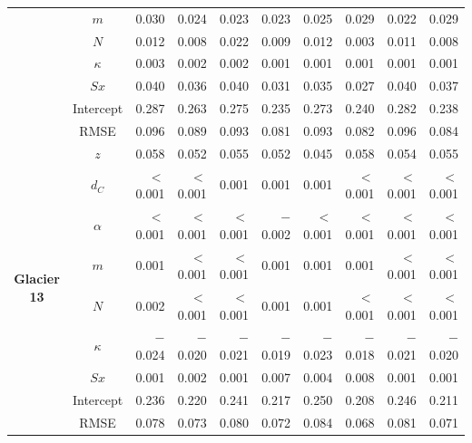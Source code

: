 \documentclass{sfuthesis}
\begin{document}
\begin{table}
\begin{tabular}{ccrrrrrrrr}
 & $m$ & 0.030 & 0.024 & 0.023 & 0.023 & 0.025 & 0.029 & 0.022 & 0.029 \\
 & $N$ & 0.012 & 0.008 & 0.022 & 0.009 & 0.012 & 0.003 & 0.011 & 0.008 \\
 & $\kappa$ & 0.003 & 0.002 & 0.002 & 0.001 & 0.001 & 0.001 & 0.001 & 0.001 \\
 & $Sx$ & 0.040 & 0.036 & 0.040 & 0.031 & 0.035 & 0.027 & 0.040 & 0.037 \\
 & Intercept & 0.287 & 0.263 & 0.275 & 0.235 & 0.273 & 0.240 & 0.282 & 0.238 \\
 & RMSE & 0.096 & 0.089 & 0.093 & 0.081 & 0.093 & 0.082 & 0.096 & 0.084 \\ \hline
\multirow{9}{*}{\textbf{Glacier 13}} & $z$ & 0.058 & 0.052 & 0.055 & 0.052 & 0.045 & 0.058 & 0.054 & 0.055 \\
 & $d_C$ & $<$0.001 & $<$0.001 & 0.001 & 0.001 & 0.001 & $<$0.001 & $<$0.001 & $<$0.001 \\
 & $\alpha$ & $<$0.001 & $<$0.001 & $<$0.001 & $-$0.002 & $<$0.001 & $<$0.001 & $<$0.001 & $<$0.001 \\
 & $m$ & 0.001 & $<$0.001 & $<$0.001 & 0.001 & 0.001 & 0.001 & $<$0.001 & $<$0.001 \\
 & $N$ & 0.002 & $<$0.001 & $<$0.001 & 0.001 & 0.001 & $<$0.001 & $<$0.001 & $<$0.001 \\
 & $\kappa$ & $-$0.024 & $-$0.020 & $-$0.021 & $-$0.019 & $-$0.023 & $-$0.018 & $-$0.021 & $-$0.020 \\
 & $Sx$ & 0.001 & 0.002 & 0.001 & 0.007 & 0.004 & 0.008 & 0.001 & 0.001 \\
 & Intercept & 0.236 & 0.220 & 0.241 & 0.217 & 0.250 & 0.208 & 0.246 & 0.211 \\
 & RMSE & 0.078 & 0.073 & 0.080 & 0.072 & 0.084 & 0.068 & 0.081 & 0.071
\end{tabular}
\end{table}
\end{document}
